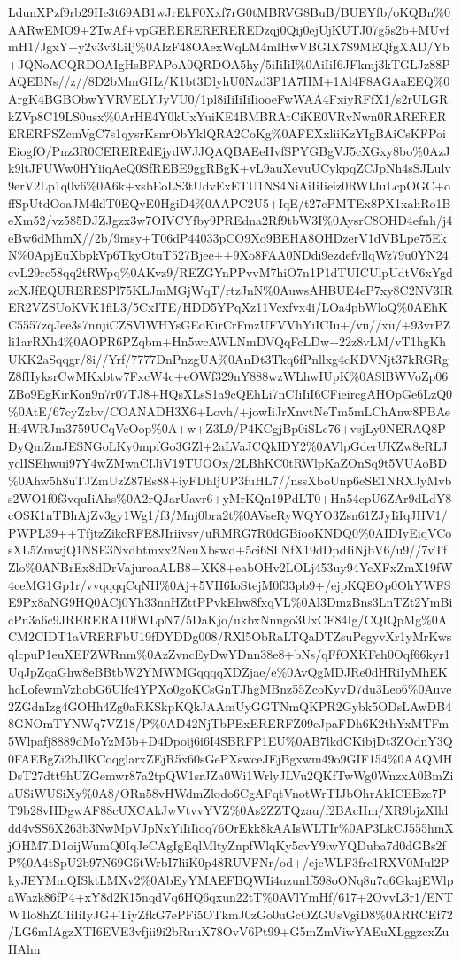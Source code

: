 \documentclass[]{article}
\begin{document}
LdunXPzf9rb29He3t69AB1wJrEkF0Xxf7rG0tMBRVG8BuB/BUEYfb/oKQBn\%0AARwEMO9+2TwAf+vpGEREREREREREDzqj0Qij0ejUjKUTJ07g5s2b+MUvfmH1/JgxY+y2v3v3LiIj\%0AIzF48OAexWqLM4mlHwVBGIX7S9MEQfgXAD/Yb+JQNoACQRDOAIgHsBFAPoA0QRDOA5hy/5iIiIiI\%0AiIiI6JFkmj3kTGLJz88PAQEBNs//z//8D2bMmGHz/K1bt3DlyhU0Nzd3P1A7HM+1Al4F8AGAaEEQ\%0ArgK4BGBObwYVRVELYJyVU0/1pl8iIiIiIiIiooeFwWAA4FxiyRFfX1/s2rULGRkZVp8C19LS0usx\%0ArHE4Y0kUxYuiKE4BMBRAtCiKE0VRvNwn0RARERERERERPSZcmVgC7s1qysrKsnrObYklQRA2CoKg\%0AFEXxliiKzYIgBAiCsKFPoiEiogfO/Pnz3R0CEREREdEjydWJJQAQBAEeHvfSPYGBgVJ5cXGxy8bo\%0AzJk9ltJFUWw0HYiiqAeQ0SfREBE9ggRBgK+vL9auXevuUCykpqZCJpNh4sSJLulv9erV2Lp1q0v6\%0A6k+xsbEoLS3tUdvExETU1NS4NiAiIiIieiz0RWIJuLcpOGC+offSpUtdOoaJM4klT0EQvE0HgiD4\%0AAPC2U5+IqE/t27cPMTEx8PX1xahRo1BeXm52/vz585DJZJgzx3w7OIVCYfby9PREdna2Rf9tbW3I\%0AysrC8OHD4efnh/j4eBw6dMhmX//2b/9msy+T06dP44033pCO9Xo9BEHA8OHDzerV1dVBLpe75EkN\%0ApjEuXbpkVp6TkyOtuT527Bjee++9Xo8FAA0NDdi9ezdefvllqWz79u0YN24cvL29rc58qq2tRWpq\%0AKvz9/REZGYnPPvvM7hiO7n1P1dTUICUlpUdtV6xYgdzcXJfEQURERESPl75KLJmMGjWqT/rtzJnN\%0AuwsAHBUE4eP7xy8C2NV3IRER2VZSUoKVK1fiL3/5CxITE/HDD5YPqXz11Vcxfvx4i/LOa4pbWloQ\%0AEhKC5557zqJee3s7nnjiCZSVlWHYsGEoKirCrFmzUFVVhYiICIu+/vu//xu/+93vrPZli1arRXh4\%0AOPR6PZqbm+Hn5wcAWLNmDVQqFcLDw+22z8vLM/vT1hgKhUKK2aSqqgr/8i//Yrf/7777DnPnzgUA\%0AnDt3Tkq6fPnllxg4cKDVNjt37kRGRgZ8fHyksrCwMKxbtw7FxcW4c+eOWf329nY888wzWLhwIUpK\%0ASlBWVoZp06ZBo9EgKirKon9n7r07TJ8+HQsXLsS1a9cQEhLi7nCIiIiI6CFieircgAHOpGe6LzQ0\%0AtE/67cyZzbv/COANADH3X6+Lovh/+jowIiJrXnvtNeTm5mLChAnw8PBAeHi4WRJm3759UCqVeOop\%0A+w+Z3L9/P4KCgjBp0iSLc76+vsjLy0NERAQ8PDyQmZmJESNGoLKy0mpfGo3GZl+2aLVaJCQkIDY2\%0AVlpGderUKZw8eRLJyclISEhwui97Y4wZMwaCIJiV19TUOOx/2LBhKC0tRWlpKaZOnSq9t5VUAoBD\%0Ahw5h8uTJZmUzZ87Es88+iyFDhljUP3fuHL7//nssXboUnp6eSE1NRXJyMvbs2WO1f0f3vquIiAhs\%0A2rQJarUavr6+yMrKQn19PdLT0+Hn54cpU6ZAr9dLdY8cOSK1nTBhAjZv3gy1Wg1/f3/Mnj0bra2t\%0AVseRyWQYO3Zsn61ZJyIiIqJHV1/PWPL39++TfjtzZikcRFE8JIriivsv/uRMRG7R0dGBiooKNDQ0\%0AIDIyEiqVCosXL5ZmwjQ1NSE3Nxdbtmxx2NeuXbswd+5ci6SLNfX19dDpdIiNjbV6/u9//7vTfZlo\%0ANBrEx8dDrVajuroaALB8+XK8+eabOHv2LOLj453uy94YcXFxZmX19fW4ceMG1Gp1r/vvqqqqCqNH\%0Aj+5VH6IoStejM0f33pb9+/ejpKQEOp0OhYWFSE9Px8aNG9HQ0ACj0Yh33nnHZttPPvkEhw8fxqVL\%0Al3DmzBns3LnTZt2YmBicPn3a6c9JRERERAT0fWLpN7/5DaKjo/ukbxNnngo3UxCE84Ig/CQIQpMg\%0ACM2CIDT1aVRERFbU19fDYDDg008/RXl5ObRaLTQaDTZsuPegyvXr1yMrKwsqlcpuP1euXEFZWRnm\%0AzZvncEyDwYDnn38e8+bNs/qFfOXKFeh0Oqf66kyr1UqJpZqaGhw8eBBtbW2YMWMGqqqqXDZjae/e\%0AvQgMDJRe0dHRiIyMhEKhcLofewmVzhobG6Ulfc4YPXo0goKCsGnTJhgMBnz55ZcoKyvD7du3Leo6\%0Auve2ZGdnIzg4GOHh4Zg0aRKSkpKQkJAAmUyGGTNmQKPR2Gybk5ODsLAwDB48GNOmTYNWq7VZ18/P\%0AD42NjTbPExERERFZ09eJpaFDh6K2thYxMTFm5Wlpafj8889dMoYzM5b+D4Dpoij6i6I4SBRFP1EU\%0AB7lkdCKibjDt3ZOdnY3Q0FAEBgZi2bJlKCoqglarxZEjR5x60sGePXswceJEjBgxwm49o9GIF154\%0AAQMHDsT27dtt9hUZGemwr87a2tpQW1srJZa0Wi1WrlyJLVu2QKfTwWg0WnzxA0BmZiaUSiWUSiXy\%0A8/ORn58vHWdmZlodo6CgAFqtVnotWrTIJbOhrAkICEBzc7PT9b28vHDgwAF88cUXCAkJwVtvvYVZ\%0As2ZZTQzau/f2BAcHm/XR9bjzXllddd4vSS6X263b3NwMpVJpNxYiIiIioq76OrEkk8kAAIsWLTIr\%0AP3LkCJ555hmXjOHM7lD1oijWumQ0IqJeCAgIgEqlMltyZnpfWlqKy5cvY9iwYQDuba7d0dGBs2fP\%0A4tSpU2b97N69G6tWrbI7liiK0p48RUVFNr/od+/ejcWLF3frc1RXV0Mul2PkyJEYMmQISktLMXv2\%0AbEyYMAEFBQWIi4uzunlf598oONq8u7q6GkajEWlpaWazk86fP4+xY8d2K15nqdVq6HQ6qxun22tT\%0AVlYmHf/617+2OvvL3r1/ENTW1lo8hZCIiIiIyJG+TiyZfkG7ePFi5OTkmJ0zGo0uGcOZGUsVgiD8\%0ARRCEf72/LG6mIAgzXTI6EVE3vfjii9i2bRuuX78OvV6Pt99+G5mZmViwYAEuXLggzcxZuHAhn
\end{document}
